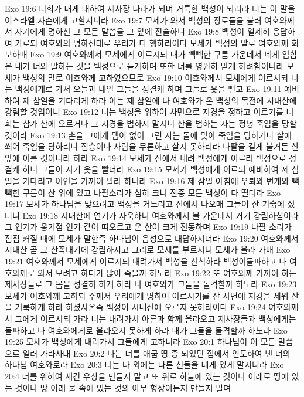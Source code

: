 Exo 19:6  너희가 내게 대하여 제사장 나라가 되며 거룩한 백성이 되리라 너는 이 말을 이스라엘 자손에게 고할지니라
Exo 19:7  모세가 와서 백성의 장로들을 불러 여호와께서 자기에게 명하신 그 모든 말씀을 그 앞에 진술하니
Exo 19:8  백성이 일제히 응답하여 가로되 여호와의 명하신대로 우리가 다 행하리이다 모세가 백성의 말로 여호와께 회보하매
Exo 19:9  여호와께서 모세에게 이르시되 내가 빽빽한 구름 가운데서 네게 임함은 내가 너와 말하는 것을 백성으로 듣게하며 또한 너를 영원히 믿게 하려함이니라 모세가 백성의 말로 여호와께 고하였으므로
Exo 19:10  여호와께서 모세에게 이르시되 너는 백성에게로 가서 오늘과 내일 그들을 성결케 하며 그들로 옷을 빨고
Exo 19:11  예비하여 제 삼일을 기다리게 하라 이는 제 삼일에 나 여호와가 온 백성의 목전에 시내산에 강림할 것임이니
Exo 19:12  너는 백성을 위하여 사면으로 지경을 정하고 이르기를 너희는 삼가 산에 오르거나 그 지경을 범하지 말지니 산을 범하는 자는 정녕 죽임을 당할 것이라
Exo 19:13  손을 그에게 댐이 없이 그런 자는 돌에 맞아 죽임을 당하거나 살에 쐬어 죽임을 당하리니 짐승이나 사람을 무론하고 살지 못하리라 나팔을 길게 불거든 산 앞에 이를 것이니라 하라
Exo 19:14  모세가 산에서 내려 백성에게 이르러 백성으로 성결케 하니 그들이 자기 옷을 빨더라
Exo 19:15  모세가 백성에게 이르되 예비하여 제 삼일을 기다리고 여인을 가까이 말라 하니라
Exo 19:16  제 삼일 아침에 우뢰와 번개와 빽빽한 구름이 산 위에 있고 나팔소리가 심히 크니 진중 모든 백성이 다 떨더라
Exo 19:17  모세가 하나님을 맞으려고 백성을 거느리고 진에서 나오매 그들이 산 기슭에 섰더니
Exo 19:18  시내산에 연기가 자욱하니 여호와께서 불 가운데서 거기 강림하심이라 그 연기가 옹기점 연기 같이 떠오르고 온 산이 크게 진동하며
Exo 19:19  나팔 소리가 점점 커질 때에 모세가 말한즉 하나님이 음성으로 대답하시더라
Exo 19:20  여호와께서 시내산 곧 그 산꼭대기에 강림하시고 그리로 모세를 부르시니 모세가 올라 가매
Exo 19:21  여호와께서 모세에게 이르시되 내려가서 백성을 신칙하라 백성이돌파하고 나 여호와께로 와서 보려고 하다가 많이 죽을까 하노라
Exo 19:22  또 여호와께 가까이 하는 제사장들로 그 몸을 성결히 하게 하라 나 여호와가 그들을 돌격할까 하노라
Exo 19:23  모세가 여호와께 고하되 주께서 우리에게 명하여 이르시기를 산 사면에 지경을 세워 산을 거룩하게 하라 하셨사온즉 백성이 시내산에 오르지 못하리이다
Exo 19:24  여호와께서 그에게 이르시되 가라 너는 내려가서 아론과 함께 올라오고 제사장들과 백성에게는 돌파하고 나 여호와에게로 올라오지 못하게 하라 내가 그들을 돌격할까 하노라
Exo 19:25  모세가 백성에게 내려가서 그들에게 고하니라
Exo 20:1  하나님이 이 모든 말씀으로 일러 가라사대
Exo 20:2  나는 너를 애굽 땅 종 되었던 집에서 인도하여 낸 너의 하나님 여호와로라
Exo 20:3  너는 나 외에는 다른 신들을 네게 있게 말지니라
Exo 20:4  너를 위하여 새긴 우상을 만들지 말고 또 위로 하늘에 있는 것이나 아래로 땅에 있는 것이나 땅 아래 물 속에 있는 것의 아무 형상이든지 만들지 말며
